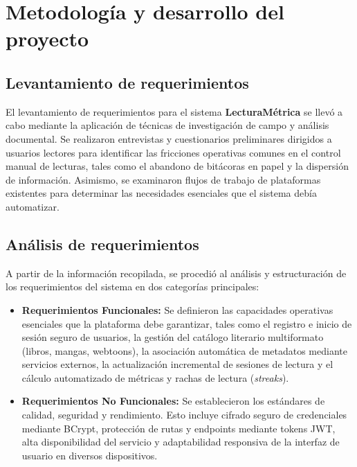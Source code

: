 \documentclass[12pt, atypical, journal]{article}
\begin{document}
\section{Metodología y desarrollo del proyecto}

\subsection{Levantamiento de requerimientos}
El levantamiento de requerimientos para el sistema \textbf{LecturaMétrica} se llevó a cabo mediante la aplicación de técnicas de investigación de campo y análisis documental. Se realizaron entrevistas y cuestionarios preliminares dirigidos a usuarios lectores para identificar las fricciones operativas comunes en el control manual de lecturas, tales como el abandono de bitácoras en papel y la dispersión de información. Asimismo, se examinaron flujos de trabajo de plataformas existentes para determinar las necesidades esenciales que el sistema debía automatizar.

\subsection{Análisis de requerimientos}
A partir de la información recopilada, se procedió al análisis y estructuración de los requerimientos del sistema en dos categorías principales:
\begin{itemize}
    \item \textbf{Requerimientos Funcionales:} Se definieron las capacidades operativas esenciales que la plataforma debe garantizar, tales como el registro e inicio de sesión seguro de usuarios, la gestión del catálogo literario multiformato (libros, mangas, webtoons), la asociación automática de metadatos mediante servicios externos, la actualización incremental de sesiones de lectura y el cálculo automatizado de métricas y rachas de lectura (\textit{streaks}).
    \item \textbf{Requerimientos No Funcionales:} Se establecieron los estándares de calidad, seguridad y rendimiento. Esto incluye cifrado seguro de credenciales mediante BCrypt, protección de rutas y endpoints mediante tokens JWT, alta disponibilidad del servicio y adaptabilidad responsiva de la interfaz de usuario en diversos dispositivos.
\end{itemize}
\end{document}
